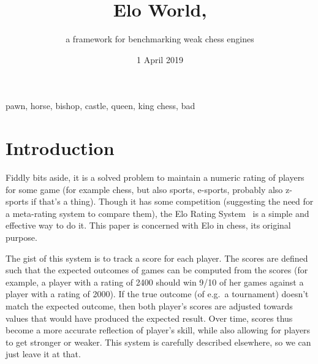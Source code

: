 \documentclass[numbers]{sigplanconf}
\begin{document}
 

\title{Elo World,}
\subtitle{a framework for benchmarking weak chess engines}


\terms
pawn, horse, bishop, castle, queen, king
\keywords
chess, bad


\newcommand\checkmate{\hspace{-.05em}\raisebox{.4ex}{\tiny\bf ++}}

\renewcommand\th{\ensuremath{{}^{\textrm{th}}}}
\newcommand\st{\ensuremath{{}^{\textrm{st}}}}
\newcommand\rd{\ensuremath{{}^{\textrm{rd}}}}
\newcommand\nd{\ensuremath{{}^{\textrm{nd}}}}
\newcommand\at{\ensuremath{\scriptstyle @}}

\date{1 April 2019}

\maketitle \thispagestyle{empty}

\section{Introduction}

Fiddly bits aside, it is a solved problem to maintain a numeric rating
of players for some game (for example chess, but also sports,
e-sports, probably also z-sports if that's a thing). Though it has
some competition (suggesting the need for a meta-rating system to
compare them), the Elo Rating System~\cite{elo1978rating} is a simple
and effective way to do it. This paper is concerned with Elo in chess,
its original purpose.

The gist of this system is to track a score for each player. The
scores are defined such that the expected outcomes of games can
be computed from the scores (for example, a player with a rating
of 2400 should win 9/10 of her games against a player with a
rating of 2000). If the true outcome (of e.g.~a tournament) doesn't
match the expected outcome, then both player's scores are adjusted
towards values that would have produced the expected result. Over
time, scores thus become a more accurate reflection of player's skill,
while also allowing for players to get stronger or weaker. This
system is carefully described elsewhere, so we can just leave it
at that.
\end{document}
